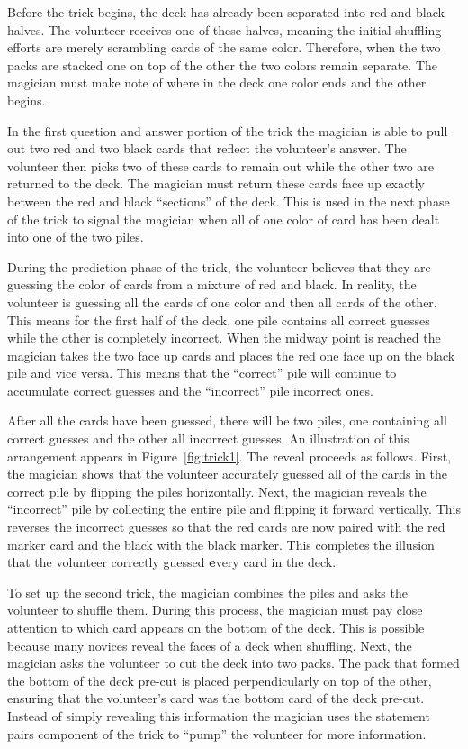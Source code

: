 Before the trick begins, the deck has already
been separated into red and black halves.
The volunteer receives one of these halves,
meaning
the initial shuffling efforts are merely scrambling
cards of the same color.
Therefore, when the two packs are
stacked one on top of the other the two colors remain
separate.
The magician must make note of where in the deck
one color ends and the other begins.

In the first question and answer portion of the trick the magician is able to
pull out two red and two black cards that reflect the volunteer's answer.  The
volunteer then picks two of these cards to remain out while the other two are
returned to the deck.  The magician must return these cards face
up exactly between the red and black ``sections'' of the deck.
This is used in the next phase of the
trick to signal the magician when all of one color of card
has been dealt into one of the two piles.

During the prediction phase of the trick, the volunteer believes that they are
guessing the color of cards from a mixture of red and black.
In reality,
the volunteer is guessing all the cards of one color and then all cards of
the other.
This means for the first half of the deck, one pile contains all correct
guesses while the other is completely incorrect.
When the midway point is reached the magician takes the two face up cards and places the
red one face up on the black pile and vice versa.
This means that the ``correct'' pile will continue to accumulate correct
guesses and the ``incorrect'' pile incorrect ones.

After all the cards have been guessed, there will be two piles,
one containing all correct guesses and the other
all incorrect guesses.
An illustration of this arrangement appears in Figure~\ref{fig:trick1}.
The reveal proceeds as follows.
First, the magician shows that the volunteer accurately guessed all of the cards
in the correct pile by flipping the piles horizontally.
Next, the magician reveals the ``incorrect'' pile by collecting the
entire pile and flipping it forward vertically.  This
reverses the incorrect guesses so that the red cards are now paired
with the red marker card and the black with the black marker.  This completes
the illusion that the volunteer correctly guessed {\textbf every} card in the
deck.

To set up the second trick, the magician combines the piles and asks the
volunteer to shuffle them.  During this process, the magician must pay close
attention to which card appears on the bottom of the deck.  This is possible
because many novices reveal the faces of a deck when shuffling.  Next,
the magician asks the volunteer to cut the deck into two packs.  The pack that
formed the bottom of the deck pre-cut is placed perpendicularly on
top of the other, ensuring that the volunteer's card was the bottom card of
the deck pre-cut. Instead of simply revealing this information the
magician uses the statement pairs component of the trick to ``pump'' the volunteer
for more information.

